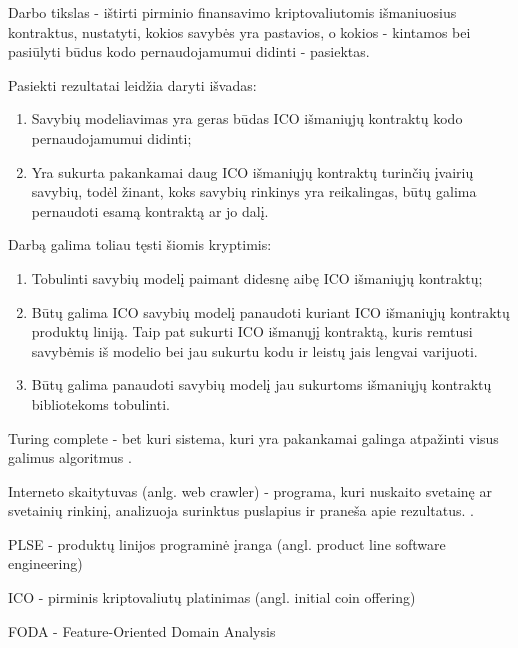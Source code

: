 \documentclass{VUMIFPSkursinis}
\begin{document}
Darbo tikslas - ištirti pirminio finansavimo kriptovaliutomis išmaniuosius kontraktus, nustatyti, kokios savybės yra pastavios, o kokios - kintamos bei pasiūlyti būdus kodo pernaudojamumui didinti - pasiektas.

\bigbreak

Pasiekti rezultatai leidžia daryti išvadas:
\begin{enumerate}[topsep=0pt,itemsep=-1ex,partopsep=1ex,parsep=1ex]
\item Savybių modeliavimas yra geras būdas ICO išmaniųjų kontraktų kodo pernaudojamumui didinti;
\item Yra sukurta pakankamai daug ICO išmaniųjų kontraktų turinčių įvairių savybių, todėl žinant, koks savybių rinkinys yra reikalingas, būtų galima pernaudoti esamą kontraktą ar jo dalį.
\end{enumerate}

\bigbreak

Darbą galima toliau tęsti šiomis kryptimis:
\begin{enumerate}[topsep=0pt,itemsep=-1ex,partopsep=1ex,parsep=1ex]
\item Tobulinti savybių modelį paimant didesnę aibę ICO išmaniųjų kontraktų;
\item Būtų galima ICO savybių modelį panaudoti kuriant ICO išmaniųjų kontraktų produktų liniją. Taip pat sukurti ICO išmanųjį kontraktą, kuris remtusi savybėmis iš modelio bei jau sukurtu kodu ir leistų jais lengvai varijuoti.
\item Būtų galima panaudoti savybių modelį jau sukurtoms išmaniųjų kontraktų bibliotekoms tobulinti.
\end{enumerate}


\printbibliography[heading=bibintoc] %

Turing complete - bet kuri sistema, kuri yra pakankamai galinga atpažinti visus galimus algoritmus \cite{Teller1994}. 

Interneto skaitytuvas (anlg. web crawler) -  programa, kuri nuskaito svetainę ar svetainių rinkinį, analizuoja surinktus puslapius ir praneša apie rezultatus. \cite{Thelwall2001}.

PLSE - produktų linijos programinė įranga (angl. product line software engineering)

ICO - pirminis kriptovaliutų platinimas (angl. initial coin offering)

FODA - Feature-Oriented Domain Analysis \cite{Kang1990}
\end{document}
